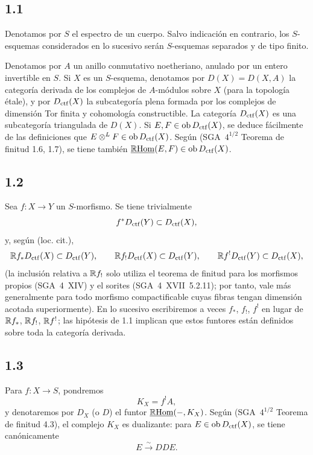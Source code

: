\subsection*{1.1}
Denotamos por $S$ el espectro de un cuerpo. Salvo indicación en contrario, los $S$-esquemas considerados en lo sucesivo serán $S$-esquemas separados y de tipo finito.

Denotamos por $A$ un anillo conmutativo noetheriano, anulado por un entero invertible en $S$. Si $X$ es un $S$-esquema, denotamos por $D(X)=D(X,A)$ la categoría derivada de los complejos de $A$-módulos sobre $X$ (para la topología étale), y por $D_{\mathrm{ctf}}(X)$ la subcategoría plena formada por los complejos de dimensión Tor finita y cohomología constructible. La categoría $D_{\mathrm{ctf}}(X)$ es una subcategoría triangulada de $D(X)$. Si $E,F \in \operatorname{ob} D_{\mathrm{ctf}}(X)$, se deduce fácilmente de las definiciones que $E \otimes^{L} F \in \operatorname{ob} D_{\mathrm{ctf}}(X)$. Según (SGA~$4^{1/2}$ Teorema de finitud 1.6, 1.7), se tiene también $\underline{\mathbb{R}\mathrm{Hom}}(E,F) \in \operatorname{ob} D_{\mathrm{ctf}}(X)$.

\subsection*{1.2}
Sea $f:X\to Y$ un $S$-morfismo. Se tiene trivialmente
\[
f^{*}D_{\mathrm{ctf}}(Y) \subset D_{\mathrm{ctf}}(X),
\]
y, según (loc. cit.),
\[
\mathbb{R} f_{*}D_{\mathrm{ctf}}(X) \subset D_{\mathrm{ctf}}(Y),\qquad
\mathbb{R} f_{!}D_{\mathrm{ctf}}(X) \subset D_{\mathrm{ctf}}(Y),\qquad
\mathbb{R} f^{!}D_{\mathrm{ctf}}(Y) \subset D_{\mathrm{ctf}}(X),
\]
(la inclusión relativa a $\mathbb{R} f_{!}$ solo utiliza el teorema de finitud para los morfismos propios (SGA~4~XIV) y el sorites (SGA~4~XVII~5.2.11); por tanto, vale más generalmente para todo morfismo compactificable cuyas fibras tengan dimensión acotada superiormente). En lo sucesivo escribiremos a veces $f_{*}$, $f_{!}$, $f^{!}$ en lugar de $\mathbb{R} f_{*}$, $\mathbb{R} f_{!}$, $\mathbb{R} f^{!}$; las hipótesis de 1.1 implican que estos funtores están definidos sobre toda la categoría derivada.

\subsection*{1.3}
Para $f:X\to S$, pondremos
\[
K_X=f^{!}A,
\]
y denotaremos por $D_X$ (o $D$) el funtor $\underline{\mathbb{R}\mathrm{Hom}}(-,K_X)$. Según (SGA~$4^{1/2}$ Teorema de finitud 4.3), el complejo $K_X$ es dualizante: para $E\in\operatorname{ob} D_{\mathrm{ctf}}(X)$, se tiene canónicamente
\[
E \xrightarrow{\sim} DDE.
\]

